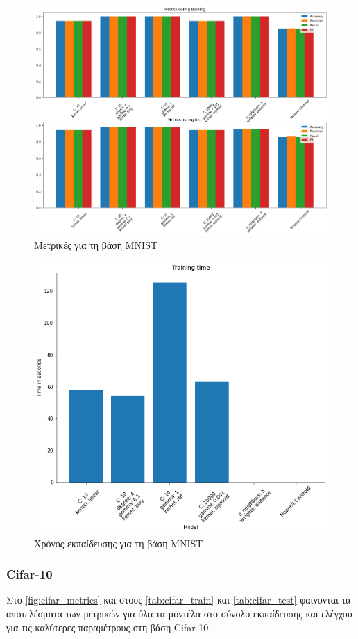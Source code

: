 \documentclass[a4paper]{article}
\begin{document}
\begin{figure}[H]
    \centering
    \includegraphics[width=\linewidth]{figures/mnist/all_metrics.png}
    \caption{Μετρικές για τη βάση MNIST}
    \label{fig:mnist_metrics}
\end{figure}

\begin{figure}[H]
    \centering
    \includegraphics[width=0.6\linewidth]{figures/mnist/training_time.png}
    \caption{Χρόνος εκπαίδευσης για τη βάση MNIST}
    \label{fig:mnist_training_times}
\end{figure}

\subsubsection{Cifar-10}

Στο \autoref{fig:cifar_metrics} και στους \autoref{tab:cifar_train} και
\autoref{tab:cifar_test} φαίνονται τα αποτελέσματα των μετρικών για όλα τα
μοντέλα στο σύνολο εκπαίδευσης και ελέγχου για τις καλύτερες παραμέτρους στη
βάση Cifar-10.
\end{document}
